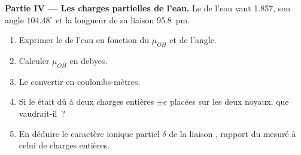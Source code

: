 \begin{problem}
\medskip
\noindent\textbf{Partie IV --- Les charges partielles de l'eau.}
Le  de l'eau vaut \qty{1.857}{\debye}, son angle
$104.48^\circ$ et la longueur de sa liaison  \qty{95.8}{pm}.
\begin{enumerate}[resume]
  \item Exprimer le  de l'eau en fonction du  $\mu_{OH}$ et de l'angle.
  \item Calculer $\mu_{OH}$ en debyes.
  \item Le convertir en coulombs-mètres.
  \item Si le  était dû à deux charges entières $\pm e$
        placées sur les deux noyaux, que vaudrait-il~?
  \item En déduire le caractère ionique partiel $\delta$ de la liaison
        , rapport du  mesuré à celui de charges
        entières.
\end{enumerate}
\end{problem}
